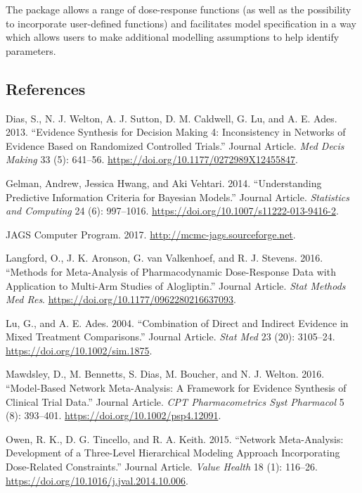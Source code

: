 \documentclass[]{article}
\begin{document}
The package allows a range of dose-response functions (as well as the
possibility to incorporate user-defined functions) and facilitates model
specification in a way which allows users to make additional modelling
assumptions to help identify parameters.

\hypertarget{references}{%
\subsection*{References}\label{references}}

\hypertarget{refs}{}
\leavevmode\hypertarget{ref-dias2013}{}%
Dias, S., N. J. Welton, A. J. Sutton, D. M. Caldwell, G. Lu, and A. E.
Ades. 2013. ``Evidence Synthesis for Decision Making 4: Inconsistency in
Networks of Evidence Based on Randomized Controlled Trials.'' Journal
Article. \emph{Med Decis Making} 33 (5): 641--56.
\url{https://doi.org/10.1177/0272989X12455847}.

\leavevmode\hypertarget{ref-gelman2014}{}%
Gelman, Andrew, Jessica Hwang, and Aki Vehtari. 2014. ``Understanding
Predictive Information Criteria for Bayesian Models.'' Journal Article.
\emph{Statistics and Computing} 24 (6): 997--1016.
\url{https://doi.org/10.1007/s11222-013-9416-2}.

\leavevmode\hypertarget{ref-jags}{}%
JAGS Computer Program. 2017. \url{http://mcmc-jags.sourceforge.net}.

\leavevmode\hypertarget{ref-langford2016}{}%
Langford, O., J. K. Aronson, G. van Valkenhoef, and R. J. Stevens. 2016.
``Methods for Meta-Analysis of Pharmacodynamic Dose-Response Data with
Application to Multi-Arm Studies of Alogliptin.'' Journal Article.
\emph{Stat Methods Med Res}.
\url{https://doi.org/10.1177/0962280216637093}.

\leavevmode\hypertarget{ref-lu2004}{}%
Lu, G., and A. E. Ades. 2004. ``Combination of Direct and Indirect
Evidence in Mixed Treatment Comparisons.'' Journal Article. \emph{Stat
Med} 23 (20): 3105--24. \url{https://doi.org/10.1002/sim.1875}.

\leavevmode\hypertarget{ref-mawdsley2016}{}%
Mawdsley, D., M. Bennetts, S. Dias, M. Boucher, and N. J. Welton. 2016.
``Model-Based Network Meta-Analysis: A Framework for Evidence Synthesis
of Clinical Trial Data.'' Journal Article. \emph{CPT Pharmacometrics
Syst Pharmacol} 5 (8): 393--401.
\url{https://doi.org/10.1002/psp4.12091}.

\leavevmode\hypertarget{ref-owen2015}{}%
Owen, R. K., D. G. Tincello, and R. A. Keith. 2015. ``Network
Meta-Analysis: Development of a Three-Level Hierarchical Modeling
Approach Incorporating Dose-Related Constraints.'' Journal Article.
\emph{Value Health} 18 (1): 116--26.
\url{https://doi.org/10.1016/j.jval.2014.10.006}.
\end{document}

